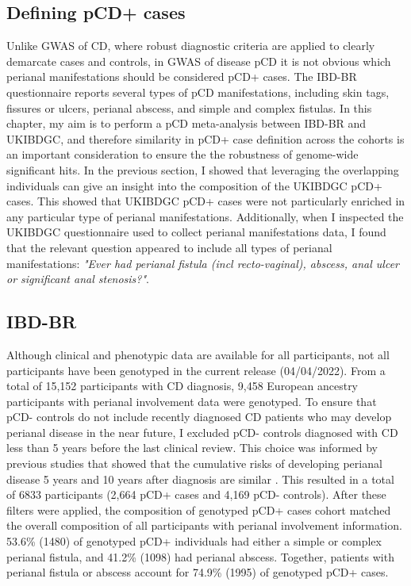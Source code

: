   \subsection{Defining pCD+ cases}
  Unlike GWAS of CD, where robust diagnostic criteria are applied to clearly demarcate cases and controls, in GWAS of disease pCD it is not obvious which perianal manifestations should be considered pCD+ cases. The IBD-BR questionnaire reports several types of pCD manifestations, including skin tags, fissures or ulcers, perianal abscess, and simple and complex fistulas. In this chapter, my aim is to perform a pCD meta-analysis between IBD-BR and UKIBDGC, and therefore similarity in pCD+ case definition across the cohorts is an important consideration to ensure the the robustness of genome-wide significant hits. In the previous section, I showed that leveraging the overlapping individuals can give an insight into the composition of the UKIBDGC pCD+ cases. This showed that UKIBDGC pCD+ cases were not particularly enriched in any particular type of perianal manifestations. Additionally, when I inspected the UKIBDGC questionnaire used to collect perianal manifestations data, I found that the relevant question appeared to include all types of perianal manifestations: \textit{"Ever had perianal fistula (incl recto-vaginal),  abscess, anal ulcer or significant anal stenosis?"}.
  
 
\subsection{IBD-BR}
Although clinical and phenotypic data are available for all participants, not all participants have been genotyped in the current release (04/04/2022). From a total of 15,152 participants with CD diagnosis, 9,458 European ancestry participants with perianal involvement data were genotyped. To ensure that pCD- controls do not include recently diagnosed CD patients who may develop perianal disease in the near future, I excluded pCD- controls diagnosed with CD less than 5 years before the last clinical review. This choice was informed by previous studies that showed that the cumulative risks of developing perianal disease 5 years and 10 years after diagnosis are similar \cite{Tsai2022-kz}. This resulted in a total of 6833 participants (2,664 pCD+ cases and 4,169 pCD- controls). After these filters were applied, the composition of genotyped pCD+ cases cohort matched the overall composition of all participants with perianal involvement information. 53.6\% (1480) of genotyped pCD+ individuals had either a simple or complex perianal fistula, and 41.2\% (1098) had perianal abscess. Together, patients with perianal fistula or abscess account for 74.9\% (1995) of genotyped pCD+ cases.

